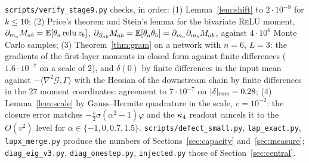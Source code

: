 \texttt{scripts/verify\_stage9.py} checks, in order: (1) Lemma~\ref{lem:shift} to $2\cdot10^{-8}$ for $k\le10$;
(2) Price's theorem and Stein's lemma for the bivariate \textsc{ReLU} moment,
$\partial_{m_a}M_{ab}=\mathbb E[\theta_a\operatorname{relu} z_b]$, $\partial_{S_{ab}}M_{ab}=\mathbb E[\theta_a\theta_b]=\partial_{m_a}\partial_{m_b}M_{ab}$,
against $4\cdot10^6$ Monte Carlo samples; (3) Theorem~\ref{thm:gram} on a network with $n=6$, $L=3$: the gradients
of the first-layer moments in closed form against finite differences ($1.6\cdot10^{-7}$ on a scale of $2$), and
$\delta(0)$ by finite differences in the input mean against $-\langle\nabla^2\mathcal G,\Gamma\rangle$ with the
Hessian of the downstream chain by finite differences in the $27$ moment coordinates: agreement to
$7\cdot10^{-7}$ on $|\delta|_{\rm rms}=0.28$; (4) Lemma~\ref{lem:scale} by Gauss--Hermite quadrature in the
scale, $v=10^{-2}$: the closure error matches $-\tfrac v2\sigma(\alpha^2-1)\varphi$ and the $\kappa_4$ readout cancels
it to the $O(v^2)$ level for $\alpha\in\{-1,0,0.7,1.5\}$.
\texttt{scripts/defect\_small.py}, \texttt{lap\_exact.py}, \texttt{lapx\_merge.py} produce the numbers of
Sections~\ref{sec:capacity} and~\ref{sec:measure}; \texttt{diag\_eig\_v3.py}, \texttt{diag\_onestep.py},
\texttt{injected.py} those of Section~\ref{sec:central}.
